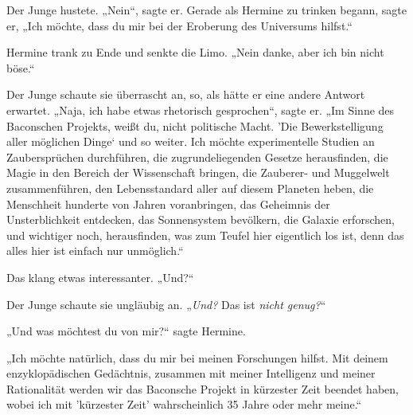 Der Junge hustete. „Nein“, sagte er. Gerade als Hermine zu trinken begann, sagte er, „Ich möchte, dass du mir bei der Eroberung des Universums hilfst.“

Hermine trank zu Ende und senkte die Limo. „Nein danke, aber ich bin nicht böse.“

Der Junge schaute sie überrascht an, so, als hätte er eine andere Antwort erwartet. „Naja, ich habe etwas rhetorisch gesprochen“, sagte er. „Im Sinne des Baconschen Projekts, weißt du, nicht politische Macht. ’Die Bewerkstelligung aller möglichen Dinge‘ und so weiter. Ich möchte experimentelle Studien an Zaubersprüchen durchführen, die zugrundeliegenden Gesetze herausfinden, die Magie in den Bereich der Wissenschaft bringen, die Zauberer- und Muggelwelt zusammenführen, den Lebensstandard aller auf diesem Planeten heben, die Menschheit hunderte von Jahren voranbringen, das Geheimnis der Unsterblichkeit entdecken, das Sonnensystem bevölkern, die Galaxie erforschen, und wichtiger noch, herausfinden, was zum Teufel hier eigentlich los ist, denn das alles hier ist einfach nur unmöglich.“

Das klang etwas interessanter. „Und?“

Der Junge schaute sie ungläubig an. „\emph{Und?} Das ist \emph{nicht genug?}“

„Und was möchtest du von mir?“ sagte Hermine.

„Ich möchte natürlich, dass du mir bei meinen Forschungen hilfst. Mit deinem enzyklopädischen Gedächtnis, zusammen mit meiner Intelligenz und meiner Rationalität werden wir das Baconsche Projekt in kürzester Zeit beendet haben, wobei ich mit 'kürzester Zeit' wahrscheinlich 35 Jahre oder mehr meine.“

